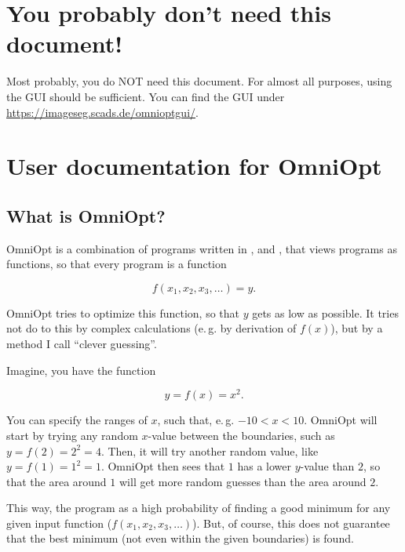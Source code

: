 \documentclass[]{scrartcl}
\begin{document}
\maketitle

\newpage

\tableofcontents

\newpage

\section{You probably don't need this document!}

Most probably, you do NOT need this document. For almost all purposes, using the GUI should be sufficient. 
You can find the GUI under \url{https://imageseg.scads.de/omnioptgui/}.

\section{User documentation for OmniOpt}

\subsection{What is OmniOpt?}

OmniOpt is a combination of programs written in ,  and ,
that views programs as functions, so that every program is a function

$$ f(x_1, x_2, x_3, \dots) = y. $$

OmniOpt tries to optimize this function, so that $y$ gets as low as possible. It tries not do to this
by complex calculations (e.\,g. by derivation of $f(x)$), but by a method I call ``clever guessing''.

Imagine, you have the function

$$ y = f(x) = x^2. $$

You can specify the ranges of $x$, such that, e.\,g. $-10 < x < 10$. OmniOpt will start by trying
any random $x$-value between the boundaries, such as $y = f(2) = 2^2 = 4$. Then, it will try another
random value, like $y = f(1) = 1^2 = 1$. OmniOpt then sees that $1$ has a lower $y$-value than $2$,
so that the area around $1$ will get more random guesses than the area around $2$. 

This way, the program as a high probability of finding a good minimum for any given input function ($f(x_1, x_2, x_3, \dots)$). 
But, of course, this does not guarantee that the best minimum (not even within the given boundaries) is found.
\end{document}
